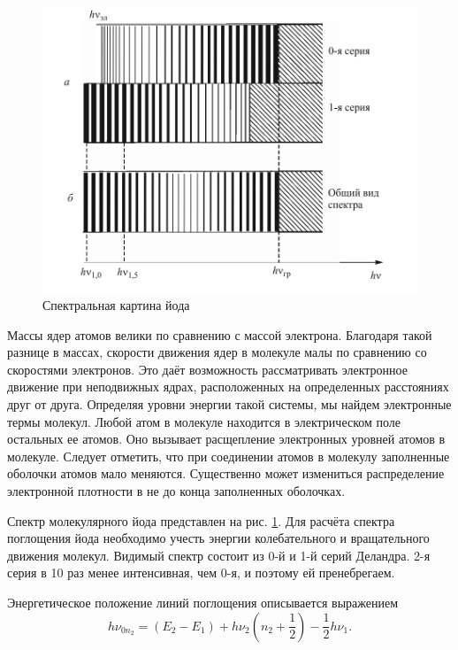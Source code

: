\documentclass[a4paper]{article}
\begin{document}
	\begin{figure}
		\includegraphics[width=1.0\linewidth]{Screenshot_3}
		\caption{Спектральная картина йода}
		\label{fig:screenshot3}
	\end{figure} 
	Массы ядер атомов велики по сравнению с массой электрона. Благодаря такой разнице в массах, скорости движения ядер в молекуле малы по сравнению со скоростями электронов. Это даёт возможность	рассматривать электронное движение при неподвижных ядрах, расположенных на определенных расстояниях друг от друга. Определяя уровни энергии такой системы, мы найдем электронные термы молекул. Любой атом в молекуле находится в электрическом поле остальных ее атомов. Оно вызывает расщепление электронных уровней атомов в молекуле. Следует отметить, что при соединении атомов в молекулу заполненные оболочки атомов мало меняются. Существенно может измениться распределение электронной плотности в не до конца заполненных оболочках.
	
	
	Спектр молекулярного йода представлен на рис. \ref{fig:screenshot3}.
	Для расчёта спектра поглощения йода необходимо учесть энергии колебательного и вращательного движения молекул. Видимый спектр состоит из 0-й и 1-й серий Деландра. 2-я серия в 10 раз менее интенсивная, чем 0-я, и поэтому ей пренебрегаем. 
	
	Энергетическое	положение линий поглощения описывается выражением
	\begin{equation}\label{eq:йод}
		h \nu_{0 n_2} = (E_2 - E_1 )+ h \nu_2 \left(n_2+\dfrac{1}{2}\right) - \dfrac{1}{2}h \nu_1.
	\end{equation}
\end{document}
